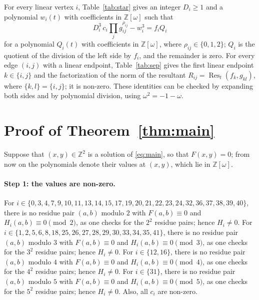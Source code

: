 \documentclass[11pt]{article}
\newcommand{\Z}{\mathbb{Z}}
\begin{document}
For every linear vertex $i$, Table~\ref{tab:star} gives an integer $D_i\geq1$ and a polynomial $w_i(t)$ with coefficients in $\Z[\omega]$ such that
\begin{equation}\label{eq:starlin}
D_i^3\,c_i\prod_jg_{ij}^{\rho_{ij}}-w_i^3=f_iQ_i
\end{equation}
for a polynomial $Q_i(t)$ with coefficients in $\Z[\omega]$, where $\rho_{ij}\in\{0,1,2\}$; $Q_i$ is the quotient of the division of the left side by $f_i$, and the remainder is zero.
For every edge $(i,j)$ with a linear endpoint, Table~\ref{tab:sep} gives the first linear endpoint $k\in\{i,j\}$ and the factorization of the norm of the resultant $R_{ij}=\operatorname{Res}_t(f_k,g_{kl})$, where $\{k,l\}=\{i,j\}$; it is non-zero.
These identities can be checked by expanding both sides and by polynomial division, using $\omega^2=-1-\omega$.

\section{Proof of Theorem~\ref{thm:main}}

Suppose that $(x,y)\in\Z^2$ is a solution of \eqref{eq:main}, so that $F(x,y)=0$; from now on the polynomials denote their values at $(x,y)$, which lie in $\Z[\omega]$.
\paragraph{Step 1: the values are non-zero.} For $i\in\{0,\allowbreak 3,\allowbreak 4,\allowbreak 7,\allowbreak 9,\allowbreak 10,\allowbreak 11,\allowbreak 13,\allowbreak 14,\allowbreak 15,\allowbreak 17,\allowbreak 19,\allowbreak 20,\allowbreak 21,\allowbreak 22,\allowbreak 23,\allowbreak 24,\allowbreak 32,\allowbreak 36,\allowbreak 37,\allowbreak 38,\allowbreak 39,\allowbreak 40\}$, there is no residue pair $(a,b)$ modulo $2$ with $F(a,b)\equiv0$ and $H_i(a,b)\equiv0\pmod{2}$, as one checks for the $2^2$ residue pairs; hence $H_i\neq0$. For $i\in\{1,\allowbreak 2,\allowbreak 5,\allowbreak 6,\allowbreak 8,\allowbreak 18,\allowbreak 25,\allowbreak 26,\allowbreak 27,\allowbreak 28,\allowbreak 29,\allowbreak 30,\allowbreak 33,\allowbreak 34,\allowbreak 35,\allowbreak 41\}$, there is no residue pair $(a,b)$ modulo $3$ with $F(a,b)\equiv0$ and $H_i(a,b)\equiv0\pmod{3}$, as one checks for the $3^2$ residue pairs; hence $H_i\neq0$. For $i\in\{12,\allowbreak 16\}$, there is no residue pair $(a,b)$ modulo $4$ with $F(a,b)\equiv0$ and $H_i(a,b)\equiv0\pmod{4}$, as one checks for the $4^2$ residue pairs; hence $H_i\neq0$. For $i\in\{31\}$, there is no residue pair $(a,b)$ modulo $5$ with $F(a,b)\equiv0$ and $H_i(a,b)\equiv0\pmod{5}$, as one checks for the $5^2$ residue pairs; hence $H_i\neq0$. Also, all $c_i$ are non-zero.
\end{document}
